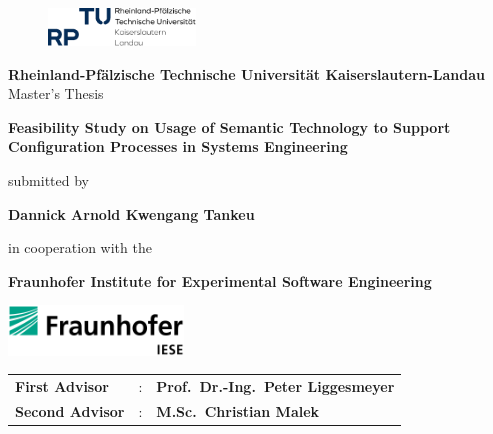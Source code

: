 \begin{titlepage}

    \begin{center}

        \begin{figure}
            \centering
            \includegraphics[width=0.35\textwidth]{images/RPTU-Logo.png}
        \end{figure}
        
        \textbf{Rheinland-Pfälzische Technische Universität Kaiserslautern-Landau}\\[2\baselineskip]

        Master's Thesis

        \vspace{0.8cm}

        \Huge
        \textbf{Feasibility Study on Usage of Semantic Technology to Support Configuration Processes in Systems Engineering}
        \vspace{1.5cm}

        \normalsize
        submitted by

        \large
        \textbf{Dannick Arnold Kwengang Tankeu}


        \vspace{1.5cm}

        \normalsize
        in cooperation with the

        \vspace{0.8cm}

        \textbf{Fraunhofer Institute for Experimental Software Engineering}

        \vspace{1.0cm}

        \includegraphics[width=0.35\textwidth]{images/logo_iese}

        \vspace{1.0cm}

        \large
        \begin{tabular}{l l l}
            \textbf{First Advisor}  &: & \textbf{Prof.~Dr.-Ing.~Peter Liggesmeyer} \\
            \textbf{Second Advisor} &: & \textbf{M.Sc.~Christian Malek} \\
        \end{tabular}

    \end{center}
\end{titlepage}
